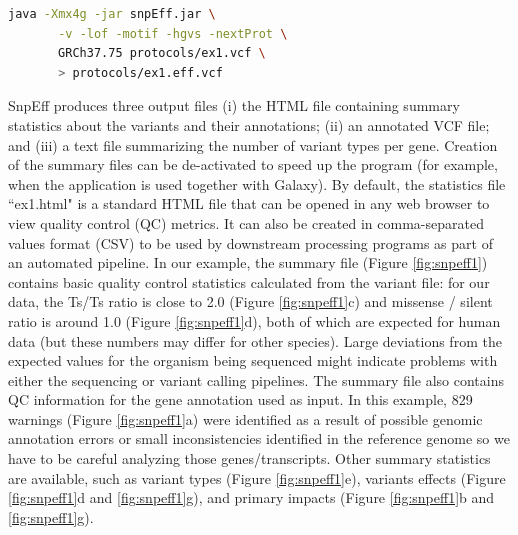 \begin{lstlisting}[language=bash]
java -Xmx4g -jar snpEff.jar \
       -v -lof -motif -hgvs -nextProt \
       GRCh37.75 protocols/ex1.vcf \
       > protocols/ex1.eff.vcf
\end{lstlisting}

SnpEff produces three output files (i) the HTML file containing summary statistics about the variants and their annotations; (ii) an annotated VCF file; and (iii) a text file summarizing the number of variant types per gene. Creation of the summary files can be de-activated to speed up the program (for example, when the application is used together with Galaxy). By default, the statistics file ``ex1.html" is a standard HTML file that can be opened in any web browser to view quality control (QC) metrics. It can also be created in comma-separated values format (CSV) to be used by downstream processing programs as part of an automated pipeline. In our example, the summary file (Figure \ref{fig:snpeff1}) contains basic quality control statistics calculated from the variant file: for our data, the Ts/Ts ratio is close to 2.0 (Figure \ref{fig:snpeff1}c) and missense / silent ratio is around 1.0 (Figure \ref{fig:snpeff1}d), both of which are expected for human data (but these numbers may differ for other species). Large deviations from the expected values for the organism being sequenced might indicate problems with either the sequencing or variant calling pipelines. The summary file also contains QC information for the gene annotation used as input. In this example, 829 warnings (Figure \ref{fig:snpeff1}a) were identified as a result of possible genomic annotation errors or small inconsistencies identified in the reference genome so we have to be careful analyzing those genes/transcripts. Other summary statistics are available, such as variant types (Figure \ref{fig:snpeff1}e), variants effects (Figure \ref{fig:snpeff1}d and \ref{fig:snpeff1}g), and primary impacts (Figure \ref{fig:snpeff1}b and \ref{fig:snpeff1}g).

